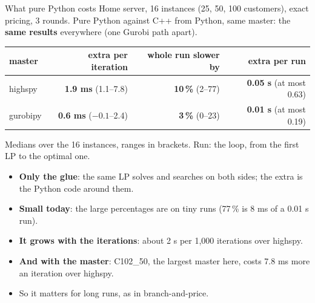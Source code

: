 \documentclass[aspectratio=169]{beamer}
\begin{document}
\begin{frame}{What pure Python costs}
  \small Home server, 16 instances (25, 50, 100 customers), exact pricing, 3 rounds. Pure Python against C++ from
  Python, same master: the \textbf{same results} everywhere (one Gurobi path apart).

  \vspace{0.5em}
  \centering
  \begin{tabular}{@{}lrrr@{}}
    \toprule
    master & extra per iteration & whole run slower by & extra per run \\
    \midrule
    highspy & \textbf{1.9 ms} (1.1--7.8) & \textbf{10\,\%} (2--77) & \textbf{0.05 s} (at most 0.63) \\
    gurobipy & \textbf{0.6 ms} ($-0.1$--2.4) & \textbf{3\,\%} (0--23) & \textbf{0.01 s} (at most 0.19) \\
    \bottomrule
  \end{tabular}

  \scriptsize Medians over the 16 instances, ranges in brackets. Run: the loop, from the first LP to the optimal one.

  \vspace{0.5em}
  \raggedright
  \begin{itemize}\small
    \item \textbf{Only the glue}: the same LP solves and searches on both sides; the extra is the Python code
      around them.
    \item \textbf{Small today}: the large percentages are on tiny runs (77\,\% is 8 ms of a 0.01 s run).
    \item \textbf{It grows with the iterations}: about 2 s per 1,000 iterations over highspy.
    \item \textbf{And with the master}: C102\_50, the largest master here, costs 7.8 ms more an iteration over
      highspy.
    \item So it matters for long runs, as in branch-and-price.
  \end{itemize}
\end{frame}
\end{document}
